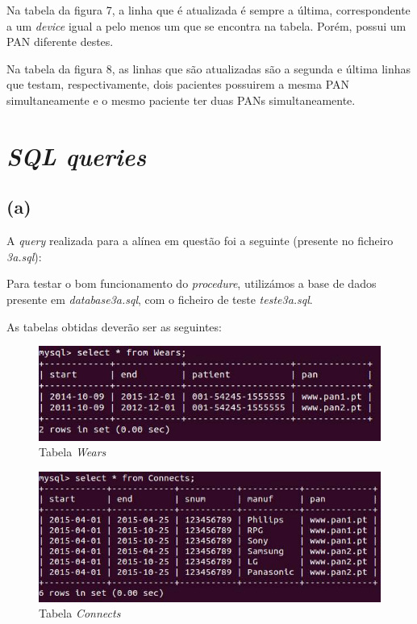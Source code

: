 \documentclass[a4paper]{article}
\begin{document}
Na tabela da figura 7, a linha que é atualizada é sempre a última, correspondente a um \textit{device} igual a pelo menos um que se encontra na tabela. Porém, possui um PAN diferente destes.

Na tabela da figura 8, as linhas que são atualizadas são a segunda e última linhas que testam,  respectivamente, dois pacientes possuirem a mesma PAN simultaneamente e o mesmo paciente ter duas PANs simultaneamente.
\section{\textit{SQL queries}}
\subsection*{(a)}
A \textit{query} realizada para a alínea em questão foi a seguinte (presente no ficheiro \textit{3a.sql}):



Para testar o bom funcionamento do \textit{procedure}, utilizámos a base de dados presente em \textit{database3a.sql}, com o ficheiro de teste \textit{teste3a.sql}.

As tabelas obtidas deverão ser as seguintes:

\begin{figure}[ht!]
\centering
\includegraphics[scale=0.53]{3awears.jpg}
\caption{Tabela \textit{Wears}}
\end{figure}

\begin{figure}[ht!]
\centering
\includegraphics[scale=0.53]{3aconnects.jpg}
\caption{Tabela \textit{Connects}}
\end{figure}
\end{document}
